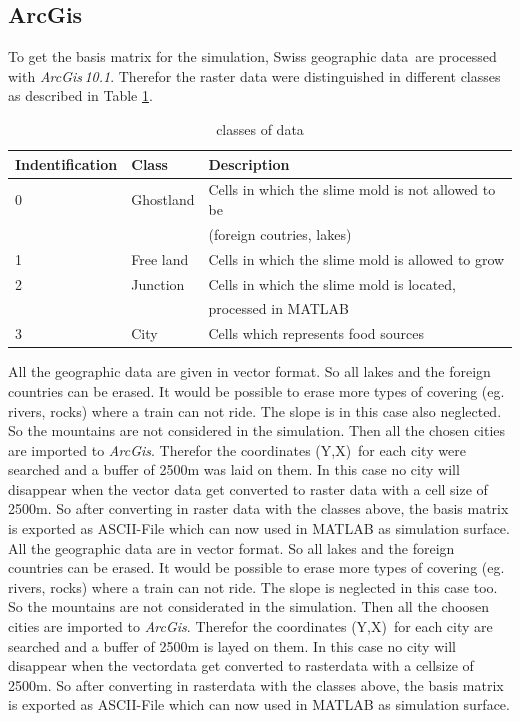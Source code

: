 \documentclass[11pt]{scrartcl}
\begin{document}
\subsection{ArcGis}
\label{sec:arcgis}

To get the basis matrix for the simulation, Swiss geographic data\,\cite{gis_data} are processed with \textit{ArcGis\,10.1}. Therefor the raster data were distinguished in different classes as described in Table \ref{tab:class}.

\begin{table}[H]
	\centering
	\caption{classes of data}
		\begin{tabular}{lll}
		\toprule
		Indentification & Class & Description \\
		\midrule
		0 & Ghostland & Cells in which the slime mold is not allowed to be\\
		& 		& (foreign coutries, lakes)\\
		1 & Free land & Cells in which the slime mold is allowed to grow\\
		2 & Junction & Cells in which the slime mold is located, \\
		& & processed in MATLAB\\
		3 & City & Cells which represents food sources\\
		\bottomrule
	\end{tabular}
\label{tab:class}
\end{table}

All the geographic data are given in vector format. So all lakes and the foreign countries can be erased. It would be possible to erase more types of covering (eg. rivers, rocks) where a train can not ride. The slope is in this case also neglected. So the mountains are not considered in the simulation. Then all the chosen cities are imported to \textit{ArcGis}. Therefor the coordinates (Y,X)\,\cite{coordinates} for each city were searched and a buffer of 2500m was laid on them. In this case no city will disappear when the vector data get converted to raster data with a cell size of 2500m. So after converting in raster data with the classes above, the basis matrix is exported as ASCII-File which can now used in MATLAB as simulation surface.
All the geographic data are in vector format. So all lakes and the foreign countries can be erased. It would be possible to erase more types of covering (eg. rivers, rocks) where a train can not ride. The slope is neglected in this case too. So the mountains are not considerated in the simulation. Then all the choosen cities are imported to \textit{ArcGis}. Therefor the coordinates (Y,X)\,\cite{coordinates} for each city are searched and a buffer of 2500m is layed on them. In this case no city will disappear when the vectordata get converted to rasterdata with a cellsize of 2500m. So after converting in rasterdata with the classes above, the basis matrix is exported as ASCII-File which can now used in MATLAB as simulation surface.
\end{document}
